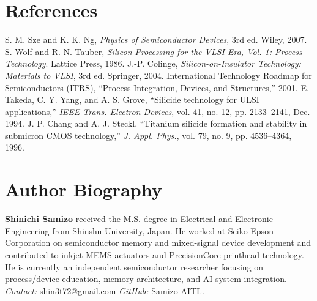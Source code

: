 \documentclass[conference]{IEEEtran}
\begin{document}
\section*{References}
\begin{thebibliography}{99}
 S. M. Sze and K. K. Ng, \textit{Physics of Semiconductor Devices}, 3rd ed. Wiley, 2007.
 S. Wolf and R. N. Tauber, \textit{Silicon Processing for the VLSI Era, Vol. 1: Process Technology}. Lattice Press, 1986.
 J.-P. Colinge, \textit{Silicon-on-Insulator Technology: Materials to VLSI}, 3rd ed. Springer, 2004.
 International Technology Roadmap for Semiconductors (ITRS), ``Process Integration, Devices, and Structures,'' 2001.
 E. Takeda, C. Y. Yang, and A. S. Grove, ``Silicide technology for ULSI applications,'' \textit{IEEE Trans. Electron Devices}, vol. 41, no. 12, pp. 2133--2141, Dec. 1994.
 J. P. Chang and A. J. Steckl, ``Titanium silicide formation and stability in submicron CMOS technology,'' \textit{J. Appl. Phys.}, vol. 79, no. 9, pp. 4536--4364, 1996.
\end{thebibliography}

\section*{Author Biography}
\textbf{Shinichi Samizo} received the M.S. degree in Electrical and Electronic Engineering from Shinshu University, Japan. 
He worked at Seiko Epson Corporation on semiconductor memory and mixed-signal device development and contributed to inkjet MEMS actuators and PrecisionCore printhead technology. 
He is currently an independent semiconductor researcher focusing on process/device education, memory architecture, and AI system integration.\\
\emph{Contact:} \href{mailto:shin3t72@gmail.com}{shin3t72@gmail.com}\quad
\emph{GitHub:} \href{https://github.com/Samizo-AITL}{Samizo-AITL}.
\end{document}
